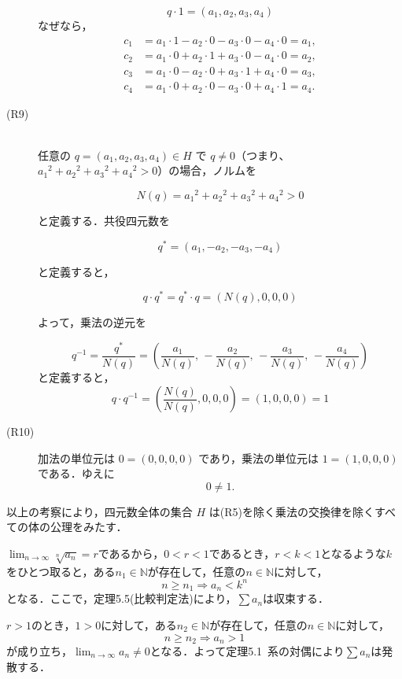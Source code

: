 \begin{tproof}
\begin{description}
              \[
                  q \cdot 1 = (a_1, a_2, a_3, a_4)
              \]
              なぜなら，
              \begin{align*}
                  c_1 & = a_1 \cdot 1 - a_2 \cdot 0 - a_3 \cdot 0 - a_4 \cdot 0 = a_1, \\
                  c_2 & = a_1 \cdot 0 + a_2 \cdot 1 + a_3 \cdot 0 - a_4 \cdot 0 = a_2, \\
                  c_3 & = a_1 \cdot 0 - a_2 \cdot 0 + a_3 \cdot 1 + a_4 \cdot 0 = a_3, \\
                  c_4 & = a_1 \cdot 0 + a_2 \cdot 0 - a_3 \cdot 0 + a_4 \cdot 1 = a_4.
              \end{align*}
        \item [(R9)] \mbox{} \\
              任意の $q = (a_1, a_2, a_3, a_4) \in H$ で $q \ne 0$（つまり、${a_1}^2 + {a_2}^2 + {a_3}^2 + {a_4}^2 > 0$）の場合，ノルムを

              \[
                  N(q) = {a_1}^2 + {a_2}^2 + {a_3}^2 + {a_4}^2 > 0
              \]

              と定義する．共役四元数を

              \[
                  q^* = (a_1, -a_2, -a_3, -a_4)
              \]

              と定義すると，

              \[
                  q \cdot q^* = q^* \cdot q = (N(q), 0, 0, 0)
              \]

              よって，乗法の逆元を

              \[
                  q^{-1} = \frac{q^*}{N(q)} = \left( \frac{a_1}{N(q)},\, -\frac{a_2}{N(q)},\, -\frac{a_3}{N(q)},\, -\frac{a_4}{N(q)} \right)
              \]
              と定義すると，
              \[
                  q \cdot q^{-1} = \left( \frac{N(q)}{N(q)}, 0, 0, 0 \right) = (1, 0, 0, 0) = 1
              \]
        \item [(R10)]
              加法の単位元は $0 = (0, 0, 0, 0)$ であり，乗法の単位元は $1 = (1, 0, 0, 0)$ である．ゆえに
              \[
                  0 \ne 1.
              \]
    \end{description}
    以上の考察により，四元数全体の集合 $H$ は(R5)を除く乗法の交換律を除くすべての体の公理をみたす．
\end{tproof}




\begin{tproof}
    $\lim_{n \to \infty} \sqrt[n]{a_n} =r$であるから，$0<r<1$であるとき，$r<k<1$となるような$k$をひとつ取ると，ある$n_1 \in \mathbb{N}$が存在して，任意の$n \in \mathbb{N}$に対して，
    \[
        n \ge n_1 \Longrightarrow a_n<k^n
    \]
    となる．ここで，定理5.5(比較判定法)により，$\sum a_n$は収束する．

    $r>1$のとき，$1>0$に対して，ある$n_2 \in \mathbb{N}$が存在して，任意の$n \in \mathbb{N}$に対して，
    \[
        n \ge n_2 \Longrightarrow a_n >1
    \]
    が成り立ち，$\lim_{n \to \infty} a_n \ne 0$となる．よって定理5.1~系の対偶により$\sum a_n$は発散する．
\end{tproof}


